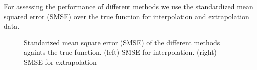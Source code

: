 \documentclass[]{interact}
\theoremstyle{plain}%
\theoremstyle{definition}
\theoremstyle{remark}
\begin{document}
For assessing the performance of different methods we use the standardized mean squared error (SMSE) over the true function for interpolation and extrapolation data. 

\begin{figure}[H]
\centering
{}
\caption{Standarized mean square error (SMSE) of the different methods againts the true function. (left) SMSE for interpolation. (right) SMSE for extrapolation}
  \label{fig10_MSE_exI_inter}
\end{figure}
\end{document}
